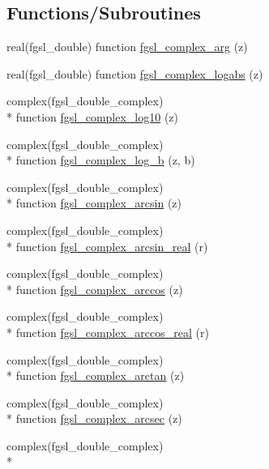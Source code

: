 \subsection*{Functions/\-Subroutines}
\begin{DoxyCompactItemize}
\item 
real(fgsl\-\_\-double) function \hyperlink{complex_8finc_a0b57597099e0abb1250c833a4e9bff77}{fgsl\-\_\-complex\-\_\-arg} (z)
\item 
real(fgsl\-\_\-double) function \hyperlink{complex_8finc_a42cb53d8f58e2ded216785a6884e761f}{fgsl\-\_\-complex\-\_\-logabs} (z)
\item 
complex(fgsl\-\_\-double\-\_\-complex) \\*
function \hyperlink{complex_8finc_ae9fc7b48e2331e3866c163ac2e8df9af}{fgsl\-\_\-complex\-\_\-log10} (z)
\item 
complex(fgsl\-\_\-double\-\_\-complex) \\*
function \hyperlink{complex_8finc_aa06abfcf4cf0160771747d99a30a6640}{fgsl\-\_\-complex\-\_\-log\-\_\-b} (z, b)
\item 
complex(fgsl\-\_\-double\-\_\-complex) \\*
function \hyperlink{complex_8finc_ae2a77be34dc8a65a8d85e5f0ee6e2629}{fgsl\-\_\-complex\-\_\-arcsin} (z)
\item 
complex(fgsl\-\_\-double\-\_\-complex) \\*
function \hyperlink{complex_8finc_a0d5f1fa6698c94d6506f1e34603e3d18}{fgsl\-\_\-complex\-\_\-arcsin\-\_\-real} (r)
\item 
complex(fgsl\-\_\-double\-\_\-complex) \\*
function \hyperlink{complex_8finc_a483b6501e53d69ff81aa184a60647d6f}{fgsl\-\_\-complex\-\_\-arccos} (z)
\item 
complex(fgsl\-\_\-double\-\_\-complex) \\*
function \hyperlink{complex_8finc_acf733006095db0ebc0b99ea36c171438}{fgsl\-\_\-complex\-\_\-arccos\-\_\-real} (r)
\item 
complex(fgsl\-\_\-double\-\_\-complex) \\*
function \hyperlink{complex_8finc_a8ee7c4c57b7f61614bfb1372f072e36d}{fgsl\-\_\-complex\-\_\-arctan} (z)
\item 
complex(fgsl\-\_\-double\-\_\-complex) \\*
function \hyperlink{complex_8finc_a14d3bb9bb647ba302d97f4cb5ef39f99}{fgsl\-\_\-complex\-\_\-arcsec} (z)
\item 
complex(fgsl\-\_\-double\-\_\-complex) \\*

\end{DoxyCompactItemize}
